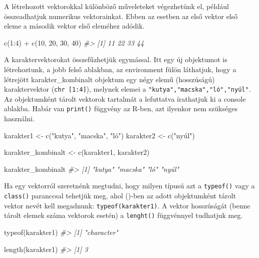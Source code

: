 \documentclass[
]{book}
\newenvironment{Shaded}{\begin{snugshade}}{\end{snugshade}}
\newcommand{\CommentTok}[1]{\textcolor[rgb]{0.56,0.35,0.01}{\textit{#1}}}
\newcommand{\DecValTok}[1]{\textcolor[rgb]{0.00,0.00,0.81}{#1}}
\newcommand{\FunctionTok}[1]{\textcolor[rgb]{0.00,0.00,0.00}{#1}}
\newcommand{\NormalTok}[1]{#1}
\newcommand{\OtherTok}[1]{\textcolor[rgb]{0.56,0.35,0.01}{#1}}
\newcommand{\SpecialCharTok}[1]{\textcolor[rgb]{0.00,0.00,0.00}{#1}}
\newcommand{\StringTok}[1]{\textcolor[rgb]{0.31,0.60,0.02}{#1}}
\begin{document}
A létrehozott vektorokkal különböző műveleteket végezhetünk el, például
összeadhatjuk numerikus vektorainkat. Ebben az esetben az első vektor
első eleme a második vektor első eleméhez adódik.

\begin{Shaded}
\begin{Highlighting}[]
\FunctionTok{c}\NormalTok{(}\DecValTok{1}\SpecialCharTok{:}\DecValTok{4}\NormalTok{) }\SpecialCharTok{+} \FunctionTok{c}\NormalTok{(}\DecValTok{10}\NormalTok{, }\DecValTok{20}\NormalTok{, }\DecValTok{30}\NormalTok{, }\DecValTok{40}\NormalTok{)}
\CommentTok{\#\textgreater{} [1] 11 22 33 44}
\end{Highlighting}
\end{Shaded}

A karaktervektorokat összefűzhetjük egymással. Itt egy új objektumot is
létrehoztunk, a jobb felső ablakban, az environment fülön láthatjuk,
hogy a létrejött karakter\_kombinalt objektum egy négy elemű
(hosszúságú) karaktervektor (\texttt{chr\ {[}1:4{]}}), melynek elemei a
\texttt{"kutya","macska","ló","nyúl"}. Az objektumként tárolt vektorok
tartalmát a lefuttatva írathatjuk ki a console ablakba. Habár van
\texttt{print()} függvény az R-ben, azt ilyenkor nem szükséges
használni.

\begin{Shaded}
\begin{Highlighting}[]
\NormalTok{karakter1 }\OtherTok{\textless{}{-}} \FunctionTok{c}\NormalTok{(}\StringTok{"kutya"}\NormalTok{, }\StringTok{"macska"}\NormalTok{, }\StringTok{"ló"}\NormalTok{)}
\NormalTok{karakter2 }\OtherTok{\textless{}{-}} \FunctionTok{c}\NormalTok{(}\StringTok{"nyúl"}\NormalTok{)}

\NormalTok{karakter\_kombinalt }\OtherTok{\textless{}{-}} \FunctionTok{c}\NormalTok{(karakter1, karakter2)}

\NormalTok{karakter\_kombinalt}
\CommentTok{\#\textgreater{} [1] "kutya"  "macska" "ló"     "nyúl"}
\end{Highlighting}
\end{Shaded}

Ha egy vektorról szeretnénk megtudni, hogy milyen típusú azt a
\texttt{typeof()} vagy a \texttt{class()} paranccsal tehetjük meg, ahol
()-ben az adott objektumként tárolt vektor nevét kell megadnunk:
\texttt{typeof(karakter1)}. A vektor hosszúságát (benne tárolt elemek
száma vektorok esetén) a \texttt{lenght()} függvénnyel tudhatjuk meg.

\begin{Shaded}
\begin{Highlighting}[]
\FunctionTok{typeof}\NormalTok{(karakter1)}
\CommentTok{\#\textgreater{} [1] "character"}

\FunctionTok{length}\NormalTok{(karakter1)}
\CommentTok{\#\textgreater{} [1] 3}
\end{Highlighting}
\end{Shaded}
\end{document}
